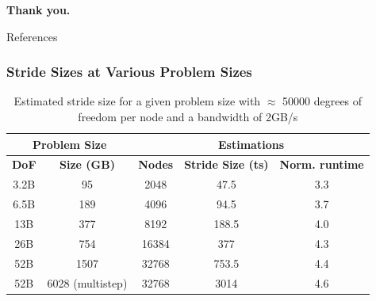 \begin{frame}
  \begin{center}
    {\Huge \bf Thank you.}
  \end{center}
\end{frame}

\begin{frame}{References}


\end{frame}


\begin{frame}
  \frametitle{Stride Sizes at Various Problem Sizes}
\begin{table}
  \centering
  \begin{tabular}{||c|c||c|c|c||}
    \hline
    \multicolumn{2}{||c||}{\bf Problem Size}&\multicolumn{3}{c||}{\bf Estimations}\\
    \hline
    {\bf DoF} & {\bf Size (GB)} & {\bf Nodes} &{\bf Stride Size
    (ts)} &{\bf Norm. runtime}\\ 
    \hline
    3.2B & 95   & 2048   & 47.5   & 3.3\\ 
    6.5B & 189  & 4096   & 94.5   & 3.7\\
    13B  & 377  & 8192   & 188.5  & 4.0\\
    26B  & 754  & 16384  & 377  & 4.3\\
    52B  & 1507 & 32768  & 753.5  & 4.4\\ 
    52B  & 6028 (multistep) & 32768  & 3014 & 4.6\\
    \hline
  \end{tabular}
  \caption{Estimated stride size for a given problem size with $\approx$ 50000
  degrees of freedom per node and a bandwidth of 2GB/s}
  \label{tab:stride}
\end{table}
\end{frame}


